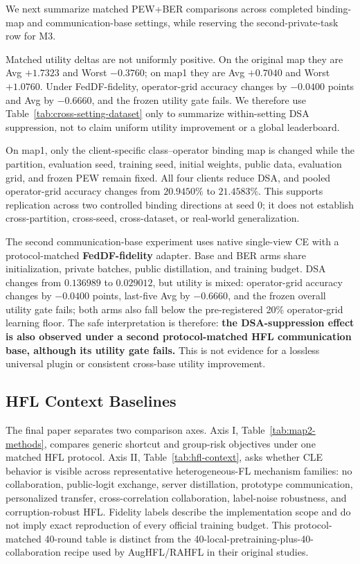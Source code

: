 We next summarize matched PEW+BER comparisons across completed binding-map and communication-base settings, while reserving the second-private-task row for M3.



Matched utility deltas are not uniformly positive. On the original map they are Avg \(+1.7323\) and Worst \(-0.3760\); on map1 they are Avg \(+0.7040\) and Worst \(+1.0760\). Under FedDF-fidelity, operator-grid accuracy changes by \(-0.0400\) points and Avg by \(-0.6660\), and the frozen utility gate fails. We therefore use Table~\ref{tab:cross-setting-dataset} only to summarize within-setting DSA suppression, not to claim uniform utility improvement or a global leaderboard.

On map1, only the client-specific class--operator binding map is changed while the partition, evaluation seed, training seed, initial weights, public data, evaluation grid, and frozen PEW remain fixed. All four clients reduce DSA, and pooled operator-grid accuracy changes from \(20.9450\%\) to \(21.4583\%\). This supports replication across two controlled binding directions at seed 0; it does not establish cross-partition, cross-seed, cross-dataset, or real-world generalization.

The second communication-base experiment uses native single-view CE with a protocol-matched \textbf{FedDF-fidelity} adapter. Base and BER arms share initialization, private batches, public distillation, and training budget. DSA changes from \(0.136989\) to \(0.029012\), but utility is mixed: operator-grid accuracy changes by \(-0.0400\) points, last-five Avg by \(-0.6660\), and the frozen overall utility gate fails; both arms also fall below the pre-registered 20\% operator-grid learning floor. The safe interpretation is therefore: \textbf{the DSA-suppression effect is also observed under a second protocol-matched HFL communication base, although its utility gate fails.} This is not evidence for a lossless universal plugin or consistent cross-base utility improvement.

\subsection{HFL Context Baselines}

The final paper separates two comparison axes. Axis I, Table~\ref{tab:map2-methods}, compares generic shortcut and group-risk objectives under one matched HFL protocol. Axis II, Table~\ref{tab:hfl-context}, asks whether CLE behavior is visible across representative heterogeneous-FL mechanism families: no collaboration, public-logit exchange, server distillation, prototype communication, personalized transfer, cross-correlation collaboration, label-noise robustness, and corruption-robust HFL. Fidelity labels describe the implementation scope and do not imply exact reproduction of every official training budget. This protocol-matched 40-round table is distinct from the 40-local-pretraining-plus-40-collaboration recipe used by AugHFL/RAHFL in their original studies.

